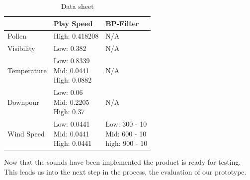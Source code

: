 \begin{table}[!ht]
\centering
\begin{tabular}{l | l | l}
 & Play Speed & BP-Filter \\
\hline
Pollen & High: 0.418208 & N/A \\
\hline
Visibility & Low: 0.382 & N/A \\
\hline
Temperature & \specialcell{Low: 0.8339 \\ Mid: 0.0441 \\ High: 0.0882} & N/A \\
\hline
Downpour & \specialcell{Low: 0.06 \\ Mid: 0.2205 \\ High: 0.37} & N/A \\
\hline
Wind Speed & \specialcell{Low: 0.0441 \\ Mid: 0.0441 \\ High: 0.0441} & \specialcell{Low: 300 - 10 \\ Mid: 600 - 10 \\ high: 900 - 10}
\end{tabular}
\caption{Data sheet}
\label{tab:data_sheet}
\end{table}

Now that the sounds have been implemented the product is ready for testing. 
This leads us into the next step in the process, the evaluation of our prototype.

